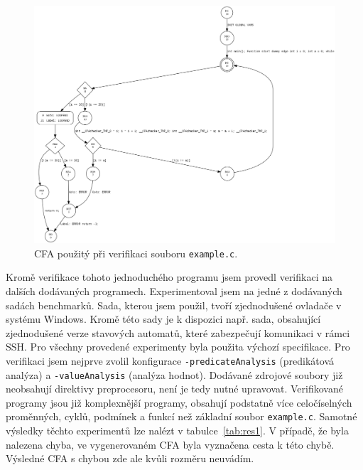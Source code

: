 \documentclass[a4paper,12pt]{article}
\begin{document}
\begin{figure}[h!]
 \centering
 \includegraphics[scale=0.3]{Images/cfa__main.png}
 \caption{CFA použitý při verifikaci souboru \texttt{example.c}.}
 \label{fig:cfa}
\end{figure}

Kromě verifikace tohoto jednoduchého programu jsem provedl verifikaci na dalších dodávaných programech. Experimentoval
jsem na jedné z dodávaných sadách benchmarků. Sada, kterou jsem použil, tvoří zjednodušené ovladače v systému Windows.
Kromě této sady je k dispozici např. sada, obsahující zjednodušené verze stavových automatů, které zabezpečují komunikaci v rámci SSH. Pro všechny provedené
experimenty byla použita výchozí specifikace. Pro verifikaci jsem nejprve zvolil konfigurace \texttt{-predicateAnalysis} (predikátová analýza) a
\texttt{-valueAnalysis} (analýza hodnot). Dodávané zdrojové soubory již neobsahují direktivy preprocesoru, není je tedy nutné upravovat. Verifikované
programy jsou již komplexnější programy, obsahují podstatně více celočíselných proměnných, cyklů, podmínek a funkcí než základní soubor \texttt{example.c}. Samotné výsledky 
těchto experimentů lze nalézt v tabulce~\ref{tab:res1}. V případě, že byla nalezena chyba,
ve vygenerovaném CFA byla vyznačena cesta k této chybě. Výsledné CFA s chybou zde ale kvůli rozměru neuvádím.
\end{document}
